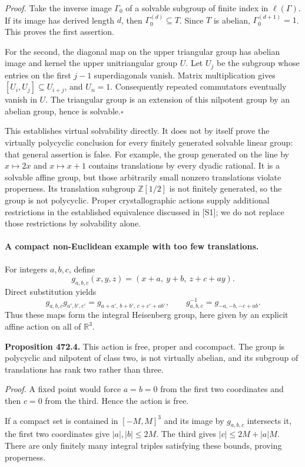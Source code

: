 \documentclass[11pt]{article}
\begin{document}
\emph{Proof.}
Take the inverse image $\Gamma_0$ of a solvable subgroup of finite
index in $\ell(\Gamma)$. If its image has derived length $d$, then
$\Gamma_0^{(d)}\subseteq T$. Since $T$ is abelian,
$\Gamma_0^{(d+1)}=1$. This proves the first assertion.

For the second, the diagonal map on the upper triangular group has
abelian image and kernel the upper unitriangular group $U$. Let $U_j$
be the subgroup whose entries on the first $j-1$ superdiagonals vanish.
Matrix multiplication gives $[U_i,U_j]\subseteq U_{i+j}$, and
$U_n=1$. Consequently repeated commutators eventually vanish in $U$.
The triangular group is an extension of this nilpotent group by an
abelian group, hence is solvable.\hfill$\square$

This establishes virtual solvability directly. It does not by itself
prove the virtually polycyclic conclusion for every finitely generated
solvable linear group: that general assertion is false. For example,
the group generated on the line by $x\mapsto2x$ and $x\mapsto x+1$
contains translations by every dyadic rational. It is a solvable affine
group, but those arbitrarily small nonzero translations violate
properness. Its translation subgroup $\mathbb Z[1/2]$ is not finitely
generated, so the group is not polycyclic. Proper crystallographic
actions supply additional restrictions in the established equivalence
discussed in [S1]; we do not replace those restrictions by solvability
alone.

\paragraph{A compact non-Euclidean example with too few translations.}
For integers $a,b,c$, define
\[
 g_{a,b,c}(x,y,z)=(x+a,\ y+b,\ z+c+ay).
\]
Direct substitution yields
\[
 g_{a,b,c}g_{a',b',c'}
 =g_{a+a',\,b+b',\,c+c'+ab'},\qquad
 g_{a,b,c}^{-1}=g_{-a,-b,-c+ab}.
\]
Thus these maps form the integral Heisenberg group, here given by an
explicit affine action on all of $\mathbb R^3$.

\textbf{Proposition 472.4.} This action is free, proper and cocompact.
The group is polycyclic and nilpotent of class two, is not virtually
abelian, and its subgroup of translations has rank two rather than three.

\emph{Proof.}
A fixed point would force $a=b=0$ from the first two coordinates and
then $c=0$ from the third. Hence the action is free.

If a compact set is contained in $[-M,M]^3$ and its image by
$g_{a,b,c}$ intersects it, the first two coordinates give
$|a|,|b|\leq2M$. The third gives
$|c|\leq2M+|a|M$. There are only finitely many integral triples
satisfying these bounds, proving properness.
\end{document}
